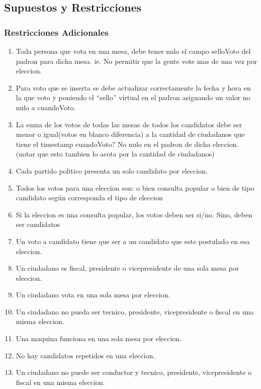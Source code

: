 \subsection{Supuestos y Restricciones}

\subsubsection{Restricciones Adicionales}

\begin{enumerate}
	\item Toda persona que vota en una mesa, debe tener nulo el campo selloVoto del padron para dicha mesa. ie. No permitir que la gente vote mas de una vez por eleccion.
	\item  Para voto que se inserta se debe actualizar correctamente la fecha y hora en la que voto y poniendo el “sello” virtual en el padron asignando un valor no nulo a cuandoVoto.
	\item  La suma de los votos de todas las mesas de todos los candidatos debe ser menor o igual(votos en blanco diferencia) a la cantidad de ciudadanos que tiene el timestamp cuandoVoto? No nulo en el padron de dicha eleccion. (notar que esto tambien lo acota por la cantidad de ciudadanos)
	\item  Cada partido politico presenta un solo candidato por eleccion.
	\item  Todos los votos para una eleccion son: o bien consulta popular o bien de tipo candidato según corresponda el tipo de eleccion
	\item Si la eleccion es una consulta popular, los votos deben ser si/no. Sino, deben ser candidatos
	\item Un voto a candidato tiene que ser a un candidato que este postulado en esa eleccion.
	\item Un ciudadano es fiscal, presidente o vicepresidente de una sola mesa por eleccion.
	\item Un ciudadano vota en una sola mesa por eleccion.
	\item Un ciudadano no pueda ser tecnico, presidente, vicepresidente o fiscal en una misma eleccion.
	\item Una maquina funciona en una sola mesa por eleccion.
	\item No hay candidatos repetidos en una eleccion.
	\item Un ciudadano no puede ser conductor y tecnico, presidente, vicepresidente o fiscal en una misma eleccion.
\end{enumerate}